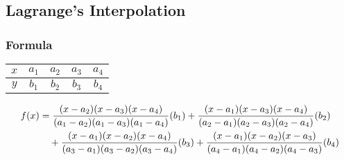 \newpage
\subsection{Lagrange's Interpolation}

\subsubsection{Formula}

\begin{center}
\begin{tabular}{|c|c|c|c|c|}
    \hline
    $x$ & $a_1$ & $a_2$ & $a_3$ & $a_4$ \\
    \hline
    $y$ & $b_1$ & $b_2$ & $b_3$ & $b_4$ \\
    \hline
\end{tabular}
\end{center}

\begin{align*}
    f(x) &= \frac{(x - a_2)(x - a_3)(x - a_4)}{(a_1 - a_2)(a_1 - a_3)(a_1 - a_4)}(b_1) + \frac{(x - a_1)(x - a_3)(x - a_4)}{(a_2 - a_1)(a_2 - a_3)(a_2 - a_4)}(b_2) \\ \notag
    &\quad + \frac{(x - a_1)(x - a_2)(x - a_4)}{(a_3 - a_1)(a_3 - a_2)(a_3 - a_4)}(b_3) + \frac{(x - a_1)(x - a_2)(x - a_3)}{(a_4 - a_1)(a_4 - a_2)(a_4 - a_3)}(b_4) \notag
\end{align*}

